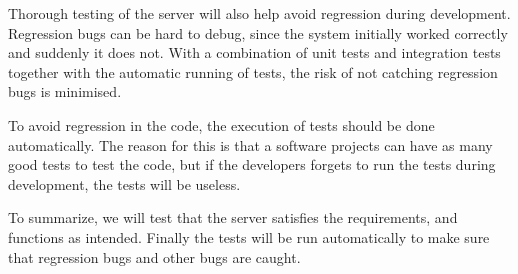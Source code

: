 Thorough testing of the server will also help avoid regression during development.
Regression bugs can be hard to debug, since the system initially worked correctly and suddenly it does not.
With a combination of unit tests and integration tests together with the automatic running of tests,
the risk of not catching regression bugs is minimised\cite{regression}.

To avoid regression in the code, the execution of tests should be done automatically.
The reason for this is that a software projects can have as many good tests to test the code,
but if the developers forgets to run the tests during development,
the tests will be useless.

\bigskip
To summarize, we will test that the server satisfies the requirements,
and functions as intended.
Finally the tests will be run automatically to make sure that regression bugs and other bugs are caught.

